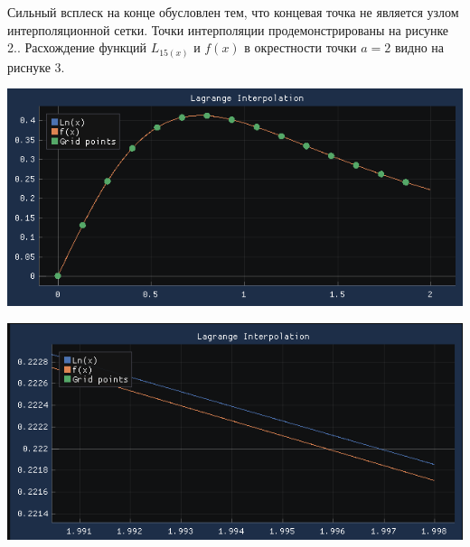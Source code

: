 \documentclass[a4paper, fontsize=14pt]{article}
\begin{document}
    Сильный всплеск на конце обусловлен тем, что концевая точка не является узлом интерполяционной сетки. Точки интерполяции продемонстрированы на рисунке 2.. Расхождение функций $L_{15(x)}$ и $f(x)$ в окрестности точки $a = 2$ видно на риснуке 3.
    \begin{center}
        \includegraphics[]{src/lagrange_n_15.png}
    \end{center}

    \begin{center}
        \includegraphics[]{src/lagrange_error_at_the_end.png}
    \end{center}
\end{document}

